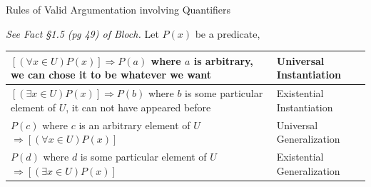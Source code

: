 \documentclass{article}
\begin{document}
	\vspace{.25cm}

	\centerline{\large{Rules of Valid Argumentation involving Quantifiers}}

	\vspace{.25cm}

	\emph{See Fact \S 1.5 (pg 49) of Bloch.}
	Let $P(x)$ be a predicate,


	\begin{tabular}{|p{4in}|l|}
		\hline
		$[(\forall x\in U)P(x)]\Rightarrow P(a)$ where $a$ is arbitrary, \newline we can chose it to be whatever we want & Universal Instantiation\\ \hline
		$[(\exists x\in U)P(x)]\Rightarrow P(b)$ where $b$ is some particular element of $U$, \newline it can not have appeared before & Existential Instantiation \\ \hline
		$P(c)$ where $c$ is an arbitrary element of $U$ $\Rightarrow [(\forall x\in U)P(x)]$ & Universal Generalization \\ \hline
		$P(d)$ where $d$ is some particular element of $U$ $\Rightarrow [(\exists x\in U)P(x)]$ & Existential Generalization \\ \hline
	\end{tabular}


	\newpage
\end{document}

